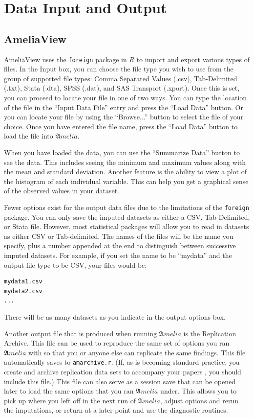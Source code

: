 \documentclass[12pt,titlepage]{article}
\begin{document}
\section{Data Input and Output}
\label{sec:data}

\subsection{AmeliaView}
\label{sec:data-gui}
AmeliaView uses the \texttt{foreign} package in $R$ to import and export
various types of files.  In the Input box, you can choose the file
type you wish to use from the group of supported file types: Comma
Separated Values (.csv), Tab-Delimited (.txt), Stata (.dta), SPSS
(.dat), and SAS Transport (.xport). Once this is set, you can proceed
to locate your file in one of two ways.  You can type the location of
the file in the ``Input Data File'' entry and press the ``Load Data''
button.  Or you can locate your file by using the ``Browse...'' button
to select the file of your choice.  Once you have entered the file
name, press the ``Load Data'' button to load the file into ${\mathfrak
  Amelia}$.

When you have loaded the data, you can use the ``Summarize Data''
button to see the data.  This includes seeing the minimum and maximum
values along with the mean and standard deviation.  Another feature is
the ability to view a plot of the histogram of each individual
variable.  This can help you get a graphical sense of the observed
values in your dataset.

Fewer options exist for the output data files due to the limitations
of the \texttt{foreign} package.  You can only save the imputed datasets as
either a CSV, Tab-Delimited, or Stata file. However, most statistical
packages will allow you to read in datasets as either CSV or
Tab-delimited.  The names of the files will be the name you specify,
plus a number appended at the end to distinguish between successive
imputed datasets.  For example, if you set the name to be ``mydata''
and the output file type to be CSV, your files would be:
\begin{verbatim}
mydata1.csv
mydata2.csv
...
\end{verbatim}
There will be as many datasets as you indicate in the output options
box.

Another output file that is produced when running ${\mathfrak Amelia}$
is the Replication Archive.  This file can be used to reproduce the
same set of options you ran ${\mathfrak Amelia}$ with so that you or
anyone else can replicate the same findings.  This file automatically
saves to \texttt{amarchive.r}.  (If, as is becoming standard practice, you
create and archive replication data sets to accompany your papers
\citep{King95}, you should include this file.)  This file can also serve
as a session save that can be opened later to load the same options
that you ran ${\mathfrak Amelia}$ under.  This allows you to pick up
where you left off in the next run of ${\mathfrak Amelia}$, adjust
options and rerun the imputations, or return at a later point and use
the diagnostic routines.
\end{document}
